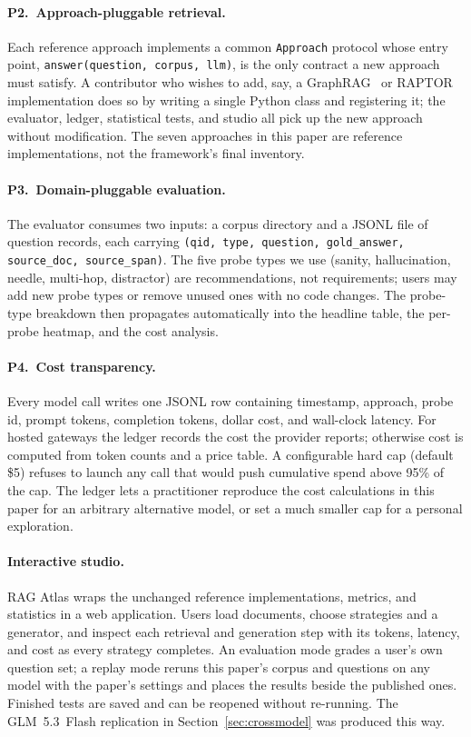 \documentclass[conference,a4paper,10pt]{IEEEtran}
\begin{document}
\paragraph{P2.~Approach-pluggable retrieval.}
Each reference approach implements a common \texttt{Approach} protocol whose entry point, \texttt{answer(question, corpus, llm)}, is the only contract a new approach must satisfy.
A contributor who wishes to add, say, a GraphRAG~\cite{edge2024graphrag} or RAPTOR~\cite{sarthi2024raptor} implementation does so by writing a single Python class and registering it; the evaluator, ledger, statistical tests, and studio all pick up the new approach without modification.
The seven approaches in this paper are reference implementations, not the framework's final inventory.

\paragraph{P3.~Domain-pluggable evaluation.}
The evaluator consumes two inputs: a corpus directory and a JSONL file of question records, each carrying \texttt{(qid, type, question, gold\_answer, source\_doc, source\_span)}.
The five probe types we use (sanity, hallucination, needle, multi-hop, distractor) are recommendations, not requirements; users may add new probe types or remove unused ones with no code changes.
The probe-type breakdown then propagates automatically into the headline table, the per-probe heatmap, and the cost analysis.

\paragraph{P4.~Cost transparency.}
Every model call writes one JSONL row containing timestamp, approach, probe id, prompt tokens, completion tokens, dollar cost, and wall-clock latency.
For hosted gateways the ledger records the cost the provider reports; otherwise cost is computed from token counts and a price table.
A configurable hard cap (default \$5) refuses to launch any call that would push cumulative spend above 95\% of the cap.
The ledger lets a practitioner reproduce the cost calculations in this paper for an arbitrary alternative model, or set a much smaller cap for a personal exploration.

\paragraph{Interactive studio.}
RAG Atlas wraps the unchanged reference implementations, metrics, and statistics in a web application.
Users load documents, choose strategies and a generator, and inspect each retrieval and generation step with its tokens, latency, and cost as every strategy completes.
An evaluation mode grades a user's own question set; a replay mode reruns this paper's corpus and questions on any model with the paper's settings and places the results beside the published ones.
Finished tests are saved and can be reopened without re-running.
The GLM~5.3~Flash replication in Section~\ref{sec:crossmodel} was produced this way.
\end{document}
